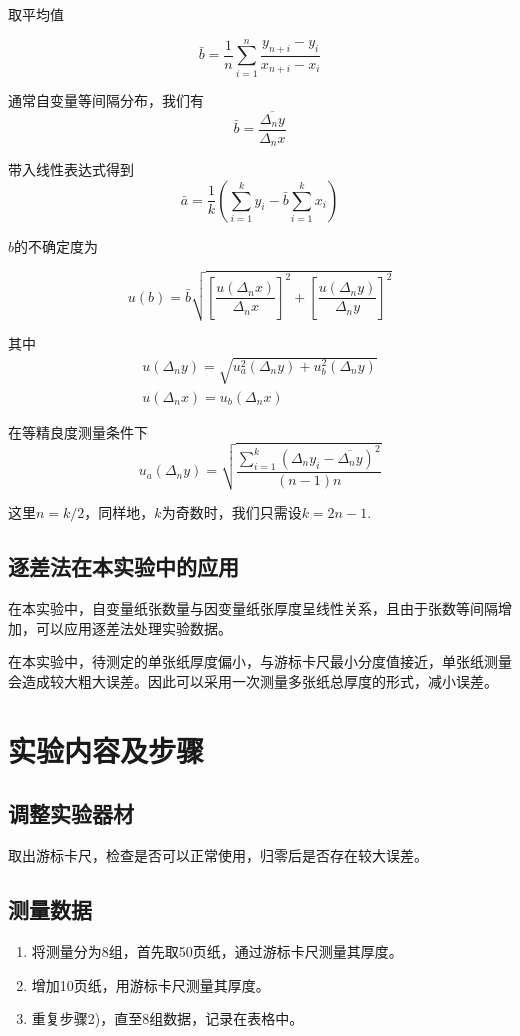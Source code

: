 \documentclass{jiwu}
\begin{document}
    取平均值\par

    $$
        \bar{b}=\dfrac{1}{n}\sum_{i=1}^n \dfrac{y_{n+i}-y_i}{x_{n+i}-x_i}
    $$
    
    通常自变量等间隔分布，我们有
    $$
        \bar{b}=\dfrac{\overline{\Delta_ny}}{\Delta_nx}
    $$

    带入线性表达式得到
    $$
        \bar{a}=\dfrac{1}{k}(\sum_{i=1}^ky_i-\bar{b}\sum_{i=1}^kx_i)
    $$

    $b$的不确定度为

    $$
        u(b)=\bar{b}\sqrt{\left[\dfrac{u(\Delta_nx)}{\Delta_nx}\right]^2+\left[\dfrac{u(\Delta_ny)}{\Delta_ny}\right]^2}
    $$

    其中
    $$
        \begin{array}{l}
            u(\Delta_ny)=\sqrt{u_a^2(\Delta_ny)+u_b^2(\Delta_ny)}\\
            u(\Delta_nx)=u_b(\Delta_nx)
        \end{array}
    $$

    在等精良度测量条件下
    $$
        u_a(\Delta_ny)=\sqrt{\dfrac{\sum_{i=1}^k(\Delta_ny_i-\overline{\Delta_ny})^2}{(n-1)n}}
    $$

    这里$n=k/2$，同样地，$k$为奇数时，我们只需设$k=2n-1$.
    \subsection{逐差法在本实验中的应用}
        在本实验中，自变量纸张数量与因变量纸张厚度呈线性关系，且由于张数等间隔增加，可以应用逐差法处理实验数据。

        在本实验中，待测定的单张纸厚度偏小，与游标卡尺最小分度值接近，单张纸测量会造成较大粗大误差。因此可以采用一次测量多张纸总厚度的形式，减小误差。
\section{实验内容及步骤}
\subsection{调整实验器材}
取出游标卡尺，检查是否可以正常使用，归零后是否存在较大误差。
\subsection{测量数据}
\begin{enumerate}[label=\arabic*)]
    \item 将测量分为8组，首先取50页纸，通过游标卡尺测量其厚度。
    \item 增加10页纸，用游标卡尺测量其厚度。
    \item 重复步骤2)，直至8组数据，记录在表格中。
\end{enumerate}
\end{document}
